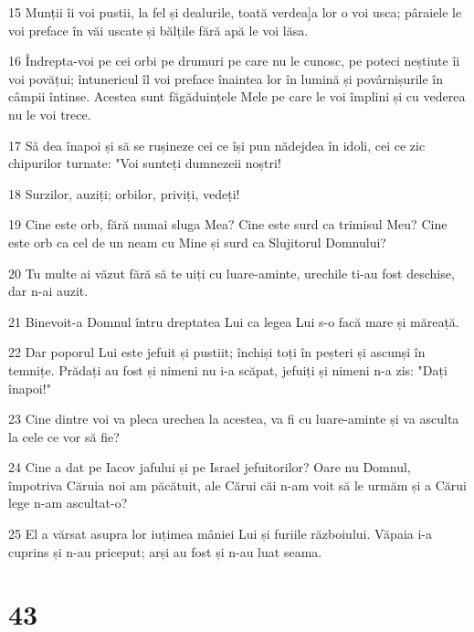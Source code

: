 \par 15 Munții îi voi pustii, la fel și dealurile, toată verdea]a lor o voi usca; pâraiele le voi preface în văi uscate și bălțile fără apă le voi lăsa.
\par 16 Îndrepta-voi pe cei orbi pe drumuri pe care nu le cunosc, pe poteci neștiute îi voi povățui; întunericul îl voi preface înaintea lor în lumină și povârnișurile în câmpii întinse. Acestea sunt făgăduințele Mele pe care le voi împlini și cu vederea nu le voi trece.
\par 17 Să dea înapoi și să se rușineze cei ce își pun nădejdea în idoli, cei ce zic chipurilor turnate: "Voi sunteți dumnezeii noștri!
\par 18 Surzilor, auziți; orbilor, priviți, vedeți!
\par 19 Cine este orb, fără numai sluga Mea? Cine este surd ca trimisul Meu? Cine este orb ca cel de un neam cu Mine și surd ca Slujitorul Domnului?
\par 20 Tu multe ai văzut fără să te uiți cu luare-aminte, urechile ti-au fost deschise, dar n-ai auzit.
\par 21 Binevoit-a Domnul întru dreptatea Lui ca legea Lui s-o facă mare și măreață.
\par 22 Dar poporul Lui este jefuit și pustiit; închiși toți în peșteri și ascunși în temnițe. Prădați au fost și nimeni nu i-a scăpat, jefuiți și nimeni n-a zis: "Dați înapoi!"
\par 23 Cine dintre voi va pleca urechea la acestea, va fi cu luare-aminte și va asculta la cele ce vor să fie?
\par 24 Cine a dat pe Iacov jafului și pe Israel jefuitorilor? Oare nu Domnul, împotriva Căruia noi am păcătuit, ale Cărui căi n-am voit să le urmăm și a Cărui lege n-am ascultat-o?
\par 25 El a vărsat asupra lor iuțimea mâniei Lui și furiile războiului. Văpaia i-a cuprins și n-au priceput; arși au fost și n-au luat seama.

\chapter{43}

